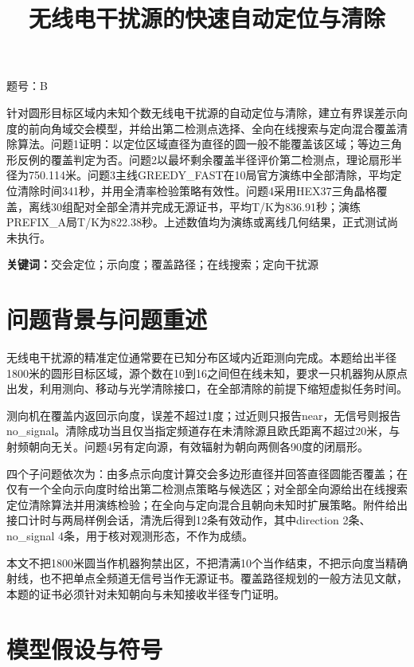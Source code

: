 \documentclass[UTF8,12pt,a4paper,fontset=none]{ctexart}
\title{无线电干扰源的快速自动定位与清除}
\author{}
\date{}
\renewenvironment{abstract}{%
  \par\small
  \begin{center}\bfseries\abstractname\end{center}%
  \par
  \setlength{\leftskip}{0pt}%
  \setlength{\rightskip}{0pt}%
}{%
  \par
}
\begin{document}
\maketitle
\begin{center}题号：B\end{center}

\begin{abstract}
针对圆形目标区域内未知个数无线电干扰源的自动定位与清除，建立有界误差示向度的前向角域交会模型，并给出第二检测点选择、全向在线搜索与定向混合覆盖清除算法。问题1证明：以定位区域直径为直径的圆一般不能覆盖该区域；等边三角形反例的覆盖判定为否。问题2以最坏剩余覆盖半径评价第二检测点，理论扇形半径为750.114米。问题3主线GREEDY\_FAST在10局官方演练中全部清除，平均定位清除时间341秒，并用全清率检验策略有效性。问题4采用HEX37三角晶格覆盖，离线30组配对全部全清并完成无源证书，平均T/K为836.91秒；演练PREFIX\_A局T/K为822.38秒。上述数值均为演练或离线几何结果，正式测试尚未执行。

\noindent\textbf{关键词：}交会定位；示向度；覆盖路径；在线搜索；定向干扰源
\end{abstract}

\clearpage

\section{问题背景与问题重述}

无线电干扰源的精准定位通常要在已知分布区域内近距测向完成。本题给出半径1800米的圆形目标区域，源个数在10到16之间但在线未知，要求一只机器狗从原点出发，利用测向、移动与光学清除接口，在全部清除的前提下缩短虚拟任务时间。

测向机在覆盖内返回示向度，误差不超过1度；过近则只报告near，无信号则报告no\_signal。清除成功当且仅当指定频道存在未清除源且欧氏距离不超过20米，与射频朝向无关。问题4另有定向源，有效辐射为朝向两侧各90度的闭扇形。

四个子问题依次为：由多点示向度计算交会多边形直径并回答直径圆能否覆盖；在仅有一个全向示向度时给出第二检测点策略与候选区；对全部全向源给出在线搜索定位清除算法并用演练检验；在全向与定向混合且朝向未知时扩展策略。附件给出接口计时与两局样例会话，清洗后得到12条有效动作，其中direction 2条、no\_signal 4条，用于核对观测形态，不作为成绩。

本文不把1800米圆当作机器狗禁出区，不把清满10个当作结束，不把示向度当精确射线，也不把单点全频道无信号当作无源证书。覆盖路径规划的一般方法见文献，本题的证书必须针对未知朝向与未知接收半径专门证明。

\section{模型假设与符号}
\end{document}
